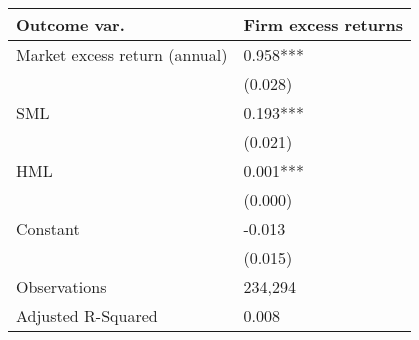 \begin{tabular}{p{}p{}}
\hline \hline
Outcome var. & Firm excess returns \\ \hline
Market excess return (annual)&       0.958***\\
                    &     (0.028)   \\
SML                 &       0.193***\\
                    &     (0.021)   \\
HML                 &       0.001***\\
                    &     (0.000)   \\
Constant            &      -0.013   \\
                    &     (0.015)   \\
\hline
Observations        &     234,294   \\
Adjusted R-Squared  &       0.008   \\
\hline\hline
\end{tabular}
